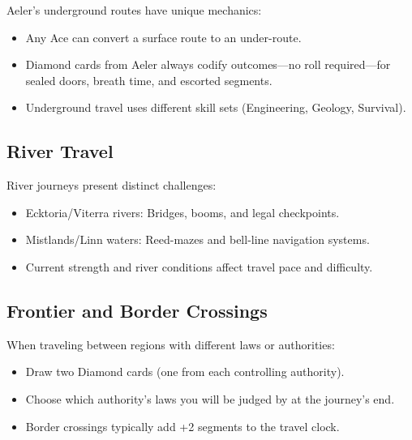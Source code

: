 Aeler's underground routes have unique mechanics:
\begin{itemize}
\item Any Ace can convert a surface route to an under-route.
\item Diamond cards from Aeler always codify outcomes—no roll required—for sealed doors, breath time, and escorted segments.
\item Underground travel uses different skill sets (Engineering, Geology, Survival).
\end{itemize}

\subsection{River Travel}
\label{subsec:river-travel}

River journeys present distinct challenges:
\begin{itemize}
\item Ecktoria/Viterra rivers: Bridges, booms, and legal checkpoints.
\item Mistlands/Linn waters: Reed-mazes and bell-line navigation systems.
\item Current strength and river conditions affect travel pace and difficulty.
\end{itemize}

\subsection{Frontier and Border Crossings}
\label{subsec:frontier-travel}

When traveling between regions with different laws or authorities:
\begin{itemize}
\item Draw two Diamond cards (one from each controlling authority).
\item Choose which authority's laws you will be judged by at the journey's end.
\item Border crossings typically add +2 segments to the travel clock.
\end{itemize}

